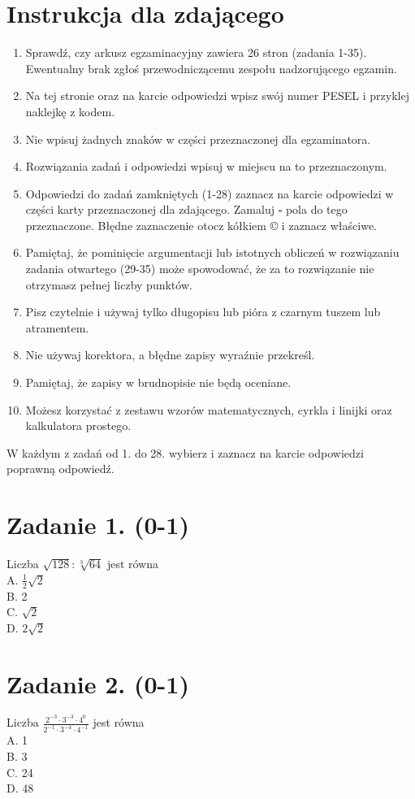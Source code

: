 \documentclass[10pt]{article}
\begin{document}
\section*{Instrukcja dla zdającego}
\begin{enumerate}
  \item Sprawdź, czy arkusz egzaminacyjny zawiera 26 stron (zadania 1-35). Ewentualny brak zgłoś przewodniczącemu zespołu nadzorującego egzamin.
  \item Na tej stronie oraz na karcie odpowiedzi wpisz swój numer PESEL i przyklej naklejkę z kodem.
  \item Nie wpisuj żadnych znaków w części przeznaczonej dla egzaminatora.
  \item Rozwiązania zadań i odpowiedzi wpisuj w miejscu na to przeznaczonym.
  \item Odpowiedzi do zadań zamkniętych (1-28) zaznacz na karcie odpowiedzi w części karty przeznaczonej dla zdającego. Zamaluj \(\square\) pola do tego przeznaczone. Błędne zaznaczenie otocz kółkiem © i zaznacz właściwe.
  \item Pamiętaj, że pominięcie argumentacji lub istotnych obliczeń w rozwiązaniu zadania otwartego (29-35) może spowodować, że za to rozwiązanie nie otrzymasz pełnej liczby punktów.
  \item Pisz czytelnie i używaj tylko długopisu lub pióra z czarnym tuszem lub atramentem.
  \item Nie używaj korektora, a błędne zapisy wyraźnie przekreśl.
  \item Pamiętaj, że zapisy w brudnopisie nie będą oceniane.
  \item Możesz korzystać z zestawu wzorów matematycznych, cyrkla i linijki oraz kalkulatora prostego.
\end{enumerate}

W każdym z zadań od 1. do 28. wybierz i zaznacz na karcie odpowiedzi poprawną odpowiedź.

\section*{Zadanie 1. (0-1)}
Liczba \(\sqrt{128}: \sqrt[3]{64}\) jest równa\\
A. \(\frac{1}{2} \sqrt{2}\)\\
B. 2\\
C. \(\sqrt{2}\)\\
D. \(2 \sqrt{2}\)

\section*{Zadanie 2. (0-1)}
Liczba \(\frac{2^{-3} \cdot 3^{-3} \cdot 4^{0}}{2^{-1} \cdot 3^{-4} \cdot 4^{-1}}\) jest równa\\
A. 1\\
B. 3\\
C. 24\\
D. 48
\end{document}
